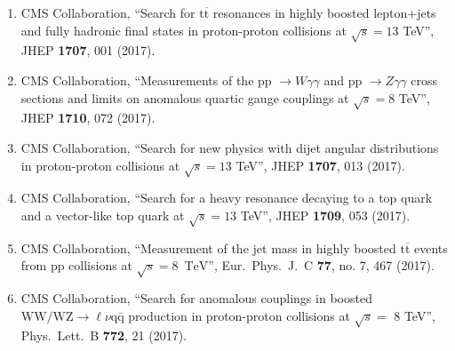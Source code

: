 \begin{itemize}
\begin{enumerate}
\item CMS Collaboration, ``Search for $ \mathrm{t}\overline{\mathrm{t}} $ resonances in highly boosted lepton+jets and fully hadronic final states in proton-proton collisions at $ \sqrt{s}=13 $ TeV'', JHEP {\bf 1707}, 001 (2017).

\item CMS Collaboration, ``Measurements of the pp $\to W\gamma\gamma$ and pp $\to Z\gamma\gamma$ cross sections and limits on anomalous quartic gauge couplings at $ \sqrt{s}=8 $ TeV'', JHEP {\bf 1710}, 072 (2017).

\item CMS Collaboration, ``Search for new physics with dijet angular distributions in proton-proton collisions at $ \sqrt{s}=13 $ TeV'', JHEP {\bf 1707}, 013 (2017).

\item CMS Collaboration, ``Search for a heavy resonance decaying to a top quark and a vector-like top quark at $ \sqrt{s}=13 $ TeV'', JHEP {\bf 1709}, 053 (2017).

\item CMS Collaboration, ``Measurement of the jet mass in highly boosted ${\mathrm{t}}\overline{\mathrm{t}}$ events from pp collisions at $\sqrt{s}=8$ $\,\text {TeV}$'', Eur.\ Phys.\ J.\ C {\bf 77}, no. 7, 467 (2017).

\item CMS Collaboration, ``Search for anomalous couplings in boosted $\mathrm{ WW/WZ }\to\ell\nu\mathrm{ q \bar{q} }$ production in proton-proton collisions at $\sqrt{s} =$ 8 TeV'', Phys.\ Lett.\ B {\bf 772}, 21 (2017).


\end{enumerate}
\end{itemize}
